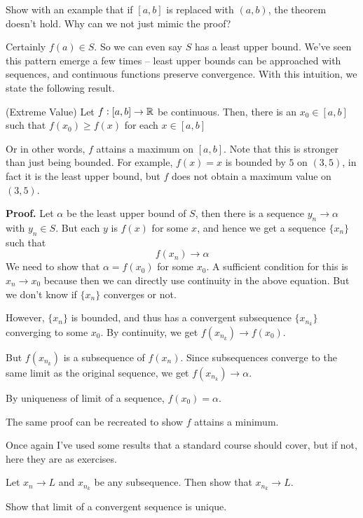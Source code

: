 \begin{SNP}{\ex}Show with an example that if $[a, b]$ is replaced with $(a, b)$, the theorem doesn't hold. Why can we not just mimic the proof?
\end{SNP}

Certainly $f(a) \in S$. So we can even say $S$ has a least upper bound. We've seen this pattern emerge a few times -- least upper bounds can be approached with sequences, and continuous functions preserve convergence. With this intuition, we state the following result.

\begin{SNP}{\thm}{(Extreme Value) Let $f: [a, b] \rightarrow \mathbb{R}$ be continuous. Then, there is an $x_0 \in [a, b]$ such that $f(x_0) \geq f(x)$ for each $x \in [a, b]$}
\end{SNP}
Or in other words, $f$ attains a maximum on $[a, b]$. Note that this is stronger than just being bounded. For example, $f(x) = x$ is bounded by $5$ on $(3, 5)$, in fact it is the least upper bound, but $f$ does not obtain a maximum value on $(3, 5)$.

\begin{smrg}
\textbf{Proof.} Let $\alpha$ be the least upper bound of $S$, then there is a sequence $y_n \rightarrow \alpha$ with $y_n \in S$. But each $y$ is $f(x)$ for some $x$, and hence we get a sequence $\{x_n\}$ such that
$$
f(x_n) \rightarrow \alpha
$$
We need to show that $\alpha = f(x_0)$ for some $x_0$. A sufficient condition for this is $x_n \rightarrow x_0$ because then we can directly use continuity in the above equation. But we don't know if $\{x_n\}$ converges or not.

However, $\{x_n\}$ is bounded, and thus has a convergent subsequence $\{x_{n_k}\}$ converging to some $x_0$. By continuity, we get $f(x_{n_k}) \rightarrow f(x_0)$.

But $f(x_{n_k})$ is a subsequence of $f(x_n)$. Since subsequences converge to the same limit as the original sequence, we get $f(x_{n_k}) \rightarrow \alpha$.

By uniqueness of limit of a sequence, $f(x_0) = \alpha$.
\end{smrg}
\begin{SNP}{\rmk}{The same proof can be recreated to show $f$ attains a minimum.}
\end{SNP}
Once again I've used some results that a standard course should cover, but if not, here they are as exercises.
\begin{SNP}{\ex}Let $x_n \rightarrow L$ and $x_{n_k}$ be any subsequence. Then show that $x_{n_k} \rightarrow L$.
\end{SNP}
\begin{SNP}{\ex}Show that limit of a convergent sequence is unique.
\end{SNP}

